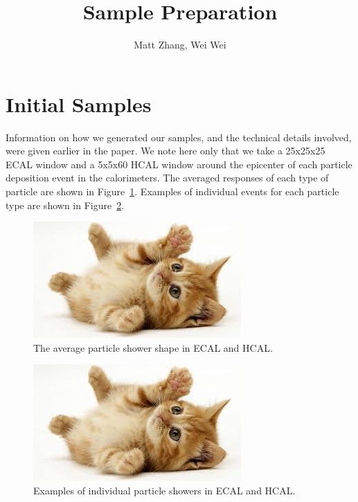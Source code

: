 \documentclass{article}
\begin{document}
    \title{Sample Preparation}
    \author{Matt Zhang, Wei Wei}
    \date{}
    \maketitle

    \section*{Initial Samples}

    Information on how we generated our samples, and the technical details involved, were given earlier in the paper. We note here only that we take a 25x25x25 ECAL window and a 5x5x60 HCAL window around the epicenter of each particle deposition event in the calorimeters. The averaged responses of each type of particle are shown in Figure~\ref{averagedParticles}. Examples of individual events for each particle type are shown in Figure~\ref{singleParticles}.

    \begin{figure}
        \begin{center}
            \includegraphics{images/cat-thumb.jpeg}
        \end{center}
        \caption{The average particle shower shape in ECAL and HCAL.}
        \label{averagedParticles}
    \end{figure}

    \begin{figure}
        \begin{center}
            \includegraphics{images/cat-thumb.jpeg}
        \end{center}
        \caption{Examples of individual particle showers in ECAL and HCAL.}
        \label{singleParticles}
    \end{figure}
\end{document}
